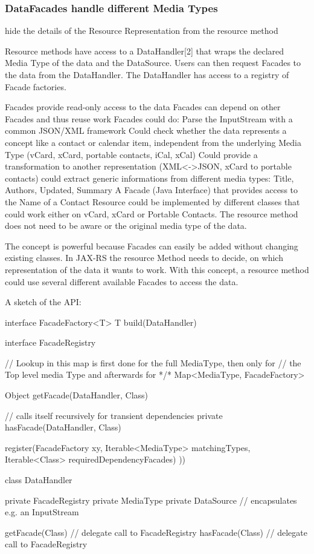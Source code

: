 \documentclass[12pt,a4paper]{scrartcl}		%
\begin{document}
\subsubsection{DataFacades handle different Media Types}


hide the details of the Resource Representation from the resource method

Resource methods have access to a DataHandler[2] that wraps the declared Media
Type of the data and the DataSource. Users can then request Facades to the data
from the DataHandler. The DataHandler has access to a registry of Facade
factories.

    Facades provide read-only access to the data
    Facades can depend on other Facades and thus reuse work
    Facades could do:
        Parse the InputStream with a common JSON/XML framework
        Could check whether the data represents a concept like a contact or calendar item, independent from the underlying Media Type (vCard, xCard, portable contacts, iCal, xCal)
        Could provide a transformation to another representation (XML<->JSON, xCard to portable contacts)
        could extract generic informations from different media types: Title, Authors, Updated, Summary
    A Facade (Java Interface) that provides access to the Name of a Contact Resource could be implemented by different classes that could work either on vCard, xCard or Portable Contacts. The resource method does not need to be aware or the original media type of the data.

The concept is powerful because Facades can easily be added without changing existing classes. In JAX-RS the resource Method needs to decide, on which representation of the data it wants to work. With this concept, a resource method could use several different available Facades to access the data.

A sketch of the API:

\begin{javalisting}[label=fig:datafacades-api,
                   caption={API of the DataFacades component}]
interface FacadeFactory<T> { T build(DataHandler) }

interface FacadeRegistry {
  // Lookup in this map is first done for the full MediaType, then only for
  // the Top level media Type and afterwards for */*
  Map<MediaType, FacadeFactory>

  Object getFacade(DataHandler, Class)

  // calls itself recursively for transient dependencies
  private hasFacade(DataHandler, Class)

  register(FacadeFactory xy, Iterable<MediaType> matchingTypes, 
           Iterable<Class> requiredDependencyFacades)
  ))
}

class DataHandler {
  private FacadeRegistry
  private MediaType
  private DataSource // encapsulates e.g. an InputStream

  getFacade(Class) // delegate call to FacadeRegistry
  hasFacade(Class) // delegate call to FacadeRegistry
}  
\end{javalisting}
\end{document}
